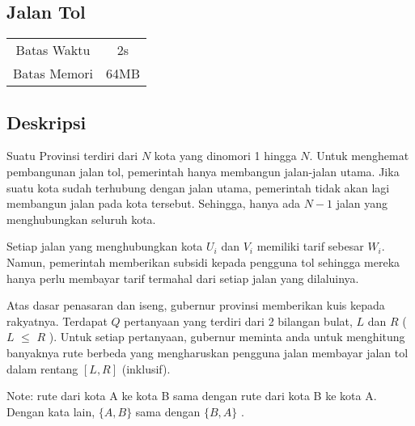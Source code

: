 \documentclass{article}
\begin{document}
\begin{center}
    \section*{Jalan Tol} %

    \begin{tabular}{ | c c | }
        \hline
        Batas Waktu  & 2s \\    %
        Batas Memori & 64MB \\  %
        \hline
    \end{tabular}
\end{center}

\subsection*{Deskripsi}



Suatu Provinsi terdiri dari $N$ kota yang dinomori 1 hingga $N$. Untuk menghemat pembangunan jalan tol, pemerintah hanya membangun jalan-jalan utama. Jika suatu kota sudah terhubung dengan jalan utama, pemerintah tidak akan lagi membangun jalan pada kota tersebut. Sehingga, hanya ada ${N-1}$ jalan yang menghubungkan seluruh kota.

Setiap jalan yang menghubungkan kota $U_i$ dan $V_i$ memiliki tarif sebesar $W_i$. Namun, pemerintah memberikan subsidi kepada pengguna tol sehingga mereka hanya perlu membayar tarif termahal dari setiap jalan yang dilaluinya.

Atas dasar penasaran dan iseng, gubernur provinsi memberikan kuis kepada rakyatnya. Terdapat $Q$ pertanyaan yang terdiri dari 2 bilangan bulat, $L$ dan $R$ ( $L$ $\leq$ $R$ ). Untuk setiap pertanyaan, gubernur meminta anda untuk menghitung banyaknya rute berbeda yang mengharuskan pengguna jalan membayar jalan tol dalam rentang $[L,R]$ (inklusif).

Note: rute dari kota A ke kota B sama dengan rute dari kota B ke kota A. Dengan kata lain, $\{A, B\}$ sama dengan $\{B, A\}$ .

\end{document}
